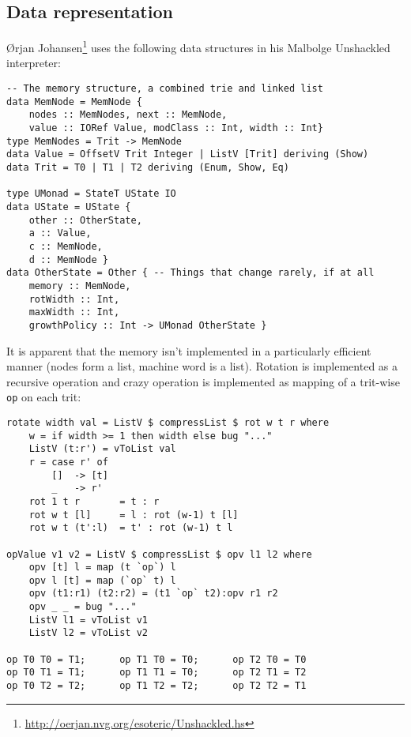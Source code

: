 \subsection{Data representation}

\par Ørjan Johansen\footnote{\url{http://oerjan.nvg.org/esoteric/Unshackled.hs}} uses the following data structures in his Malbolge Unshackled interpreter:

\begin{verbatim}
-- The memory structure, a combined trie and linked list
data MemNode = MemNode {
    nodes :: MemNodes, next :: MemNode,
    value :: IORef Value, modClass :: Int, width :: Int}
type MemNodes = Trit -> MemNode
data Value = OffsetV Trit Integer | ListV [Trit] deriving (Show)
data Trit = T0 | T1 | T2 deriving (Enum, Show, Eq)

type UMonad = StateT UState IO
data UState = UState {
    other :: OtherState,
    a :: Value,
    c :: MemNode,
    d :: MemNode }
data OtherState = Other { -- Things that change rarely, if at all
    memory :: MemNode,
    rotWidth :: Int,
    maxWidth :: Int,
    growthPolicy :: Int -> UMonad OtherState }
\end{verbatim}

\par It is apparent that the memory isn't implemented in a particularly efficient manner (nodes form a list, machine word is a list). Rotation is implemented as a recursive operation and crazy operation is implemented as mapping of a trit-wise \verb|op| on each trit:

\begin{verbatim}
rotate width val = ListV $ compressList $ rot w t r where
    w = if width >= 1 then width else bug "..."
    ListV (t:r') = vToList val
    r = case r' of
        []  -> [t]
        _   -> r'
    rot 1 t r       = t : r
    rot w t [l]     = l : rot (w-1) t [l]
    rot w t (t':l)  = t' : rot (w-1) t l

opValue v1 v2 = ListV $ compressList $ opv l1 l2 where
    opv [t] l = map (t `op`) l
    opv l [t] = map (`op` t) l
    opv (t1:r1) (t2:r2) = (t1 `op` t2):opv r1 r2
    opv _ _ = bug "..."
    ListV l1 = vToList v1
    ListV l2 = vToList v2

op T0 T0 = T1;      op T1 T0 = T0;      op T2 T0 = T0
op T0 T1 = T1;      op T1 T1 = T0;      op T2 T1 = T2
op T0 T2 = T2;      op T1 T2 = T2;      op T2 T2 = T1
\end{verbatim}

